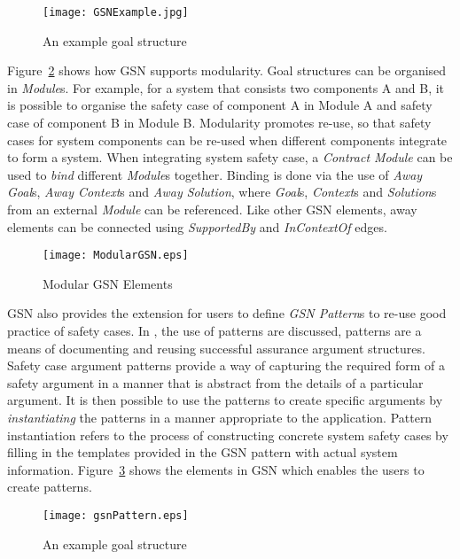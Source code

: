 \begin{figure}
	\centering
	\texttt{[image: GSNExample.jpg]}
	\caption{An example goal structure}
	\label{fig:goalStructure}
\end{figure}
Figure~\ref{fig:modularGSN} shows how GSN supports modularity. Goal structures can be organised in \textit{Module}s. For example, for a system that consists two components A and B, it is possible to organise the safety case of component A in Module A and safety case of component B in Module B. Modularity promotes re-use, so that safety cases for system components can be re-used when different components integrate to form a system. When integrating system safety case, a \textit{Contract Module} can be used to \textit{bind} different \textit{Module}s together. Binding is done via the use of \textit{Away Goal}s, \textit{Away Context}s and \textit{Away Solution}, where \textit{Goal}s, \textit{Context}s and \textit{Solution}s from an external \textit{Module} can be referenced. Like other GSN elements, away elements can be connected using \textit{SupportedBy} and \textit{InContextOf} edges.

\begin{figure}
	\centering
	\texttt{[image: ModularGSN.eps]}
	\caption{Modular GSN Elements}
	\label{fig:modularGSN}
\end{figure}

GSN also provides the extension for users to define \textit{GSN Pattern}s to re-use good practice of safety cases. In \cite{kelly1997safety}, the use of patterns are discussed, patterns are a means of documenting and reusing successful assurance argument structures. Safety case argument patterns provide a way of capturing the required form of a safety argument in a manner that is abstract from the details of a particular argument. It is then possible to use the patterns to create specific arguments by \textit{instantiating} the patterns in a manner appropriate to the application. Pattern instantiation refers to the process of constructing concrete system safety cases by filling in the templates provided in the GSN pattern with actual system information. Figure~\ref{fig:gsnPatterns} shows the elements in GSN which enables the users to create patterns.

\begin{figure}
	\centering
	\texttt{[image: gsnPattern.eps]}
	\caption{An example goal structure}
	\label{fig:gsnPatterns}
\end{figure}

